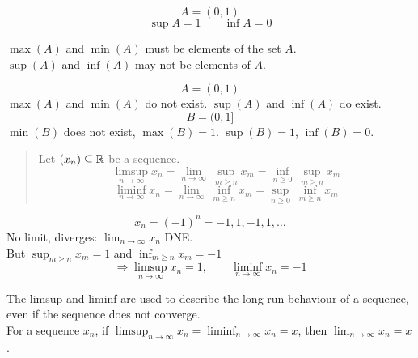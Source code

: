 \begin{example}
    \[A = (0,1)\]
    \[\sup A = 1 \qquad \inf A = 0\]
\end{example}

$\max(A)$ and $\min(A)$ must be elements of the set $A$.
\\ $\sup(A)$ and $\inf(A)$ may not be elements of $A$.

\begin{example}
    \[A = (0,1)\]
    $\max(A)$ and $\min(A)$ do not exist. $\sup(A)$ and $\inf(A)$ do exist.
    \[B = (0,1]\]
    $\min(B)$ does not exist, $\max(B) = 1$. $\sup(B) = 1$, $\inf(B) = 0$.
\end{example}

\begin{quote}
    Let $(x_n) \subseteq \mathbb{R}$ be a sequence.
    \[\limsup_{n\to\infty} x_n = \lim_{n\to\infty}\ \sup_{m\geq n} x_m = \inf_{n\geq 0}\ \sup_{m\geq n} x_m\]
    \[\liminf_{n\to\infty} x_n = \lim_{n\to\infty}\ \inf_{m\geq n} x_m = \sup_{n\geq 0}\ \inf_{m\geq n} x_m\]
\end{quote}

\begin{center}
\end{center}

\begin{example}
    \[x_n = (-1)^n = -1,1,-1,1,\dots\]
    No limit, diverges: $\displaystyle\lim_{n\to\infty} x_n$ DNE.
    \\ But $\displaystyle\sup_{m\geq n} x_m = 1$ and $\displaystyle\inf_{m\geq n} x_m = -1$
    \[\Rightarrow \limsup_{n\to\infty} x_n = 1, \qquad \liminf_{n\to\infty} x_n = -1\]
\end{example}

The limsup and liminf are used to describe the long-run behaviour of a sequence, even if the sequence does not converge.
\\ For a sequence $x_n$, if $\displaystyle\limsup_{n\to\infty} x_n = \liminf_{n\to\infty} x_n = x$, then $\displaystyle\lim_{n\to\infty} x_n = x$.

